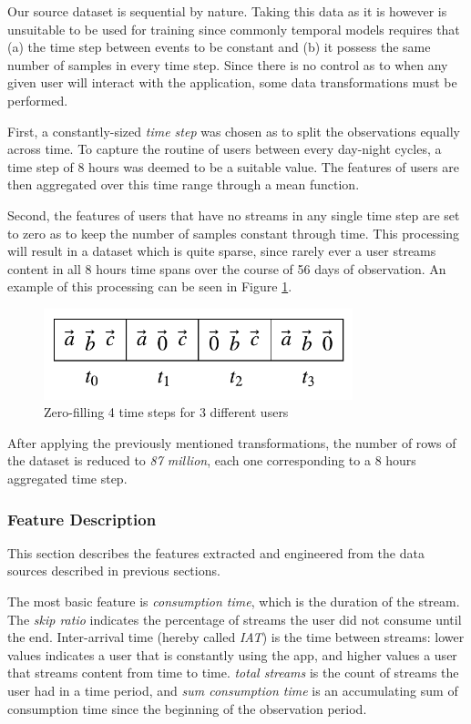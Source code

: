 \documentclass{kththesis}
\begin{document}
Our source dataset is sequential by nature. Taking this data as it is however is unsuitable to be used for training since commonly temporal models requires that (a) the time step between events to be constant and (b) it possess the same number of samples in every time step. Since there is no control as to when any given user will interact with the application, some data transformations must be performed. 

First, a constantly-sized \emph{time step} was chosen as to split the observations equally across time. To capture the routine of users between every day-night cycles, a time step of 8 hours was deemed to be a suitable value. The features of users are then aggregated over this time range through a mean function. 

Second, the features of users that have no streams in any single time step are set to zero as to keep the number of samples constant through time. This processing will result in a dataset which is quite sparse, since rarely ever a user streams content in all 8 hours time spans over the course of 56 days of observation. An example of this processing can be seen in Figure \ref{fig:zerofill}.

	\begin{figure}[h]
    \centering
    \includegraphics[width=0.8\textwidth,keepaspectratio]{figures/zero_fill.pdf}
    \caption{Zero-filling 4 time steps for 3 different users}
    \label{fig:zerofill}
	\end{figure}

After applying the previously mentioned transformations, the number of rows of the dataset is reduced to \emph{87 million}, each one corresponding to a 8 hours aggregated time step.

\subsubsection{Feature Description}

This section describes the features extracted and engineered from the data sources described in previous sections.

The most basic feature is \emph{consumption time}, which is the duration of the stream. The \emph{skip ratio} indicates the percentage of streams the user did not consume until the end. Inter-arrival time (hereby called \emph{IAT}) is the time between streams: lower values indicates a user that is constantly using the app, and higher values a user that streams content from time to time. \emph{total streams} is the count of streams the user had in a time period, and \emph{sum consumption time} is an accumulating sum of consumption time since the beginning of the observation period.
\end{document}
